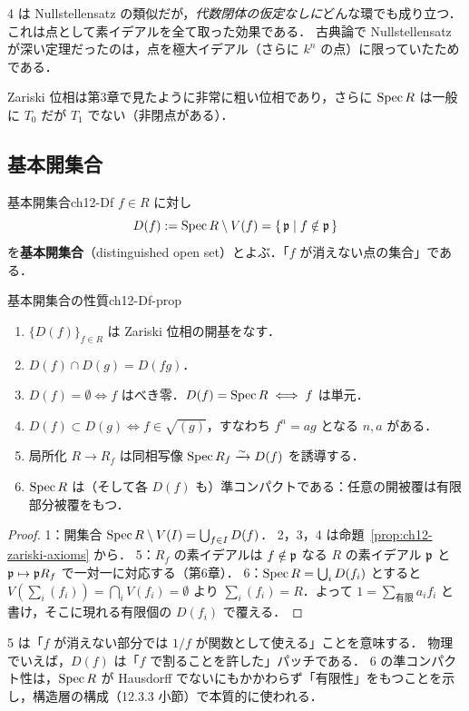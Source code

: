 4 は Nullstellensatz の類似だが，\emph{代数閉体の仮定なしに}どんな環でも成り立つ．
これは点として素イデアルを全て取った効果である．
古典論で Nullstellensatz が深い定理だったのは，点を極大イデアル（さらに $k^n$ の点）に限っていたためである．

Zariski 位相は第3章で見たように非常に粗い位相であり，さらに $\operatorname{Spec} R$ は一般に $T_0$ だが $T_1$ でない（非閉点がある）．

\subsection{基本開集合}

\begin{mydef}{基本開集合}{ch12-Df}
$f\in R$ に対し
\[
  D(f) := \operatorname{Spec} R\setminus V(f) = \{\,\mathfrak{p}\mid f\notin\mathfrak{p}\,\}
\]
を\textbf{基本開集合}（distinguished open set）とよぶ．「$f$ が消えない点の集合」である．
\end{mydef}

\begin{myprop}{基本開集合の性質}{ch12-Df-prop}
\begin{enumerate}
  \item $\{D(f)\}_{f\in R}$ は Zariski 位相の開基をなす．
  \item $D(f)\cap D(g)=D(fg)$．
  \item $D(f)=\emptyset\iff f$ はべき零．$D(f)=\operatorname{Spec} R\iff f$ は単元．
  \item $D(f)\subset D(g)\iff f\in\sqrt{(g)}$，すなわち $f^n=ag$ となる $n,a$ がある．
  \item 局所化 $R\to R_f$ は同相写像 $\operatorname{Spec} R_f\xrightarrow{\sim}D(f)$ を誘導する．
  \item $\operatorname{Spec} R$ は（そして各 $D(f)$ も）準コンパクトである：任意の開被覆は有限部分被覆をもつ．
\end{enumerate}
\end{myprop}
\begin{proof}
1：開集合 $\operatorname{Spec} R\setminus V(I)=\bigcup_{f\in I}D(f)$．
2，3，4 は命題~\ref{prop:ch12-zariski-axioms} から．
5：$R_f$ の素イデアルは $f\notin\mathfrak{p}$ なる $R$ の素イデアル $\mathfrak{p}$ と $\mathfrak{p}\mapsto\mathfrak{p} R_f$ で一対一に対応する（第6章）．
6：$\operatorname{Spec} R=\bigcup_iD(f_i)$ とすると $V(\sum_i(f_i))=\bigcap_iV(f_i)=\emptyset$ より $\sum_i (f_i)=R$．よって $1=\sum_{\text{有限}}a_if_i$ と書け，そこに現れる有限個の $D(f_i)$ で覆える．
\end{proof}

5 は「$f$ が消えない部分では $1/f$ が関数として使える」ことを意味する．
物理でいえば，$D(f)$ は「$f$ で割ることを許した」パッチである．
6 の準コンパクト性は，$\operatorname{Spec} R$ が Hausdorff でないにもかかわらず「有限性」をもつことを示し，構造層の構成（12.3.3 小節）で本質的に使われる．

